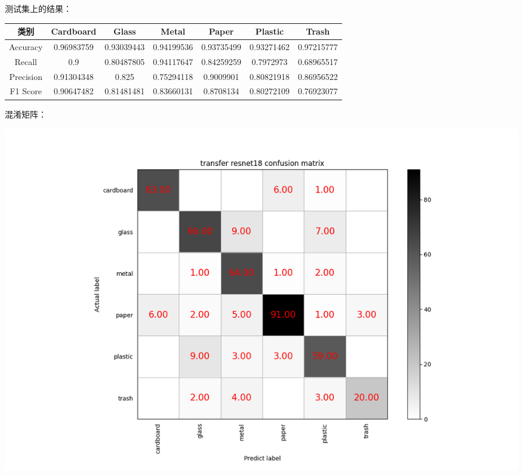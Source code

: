 \documentclass[UTF8]{ctexart}
\begin{document}
测试集上的结果：

\begin{tabular}{|c|c|c|c|c|c|c|}
\hline 
类别 & Cardboard & Glass & Metal & Paper & Plastic & Trash \\ 
\hline 
Accuracy &0.96983759& 0.93039443 &0.94199536& 0.93735499 &0.93271462& 0.97215777\\
 \hline 
Recall &0.9       & 0.80487805& 0.94117647& 0.84259259& 0.7972973 & 0.68965517\\ 
\hline 
Precision &0.91304348& 0.825  &    0.75294118& 0.9009901 & 0.80821918& 0.86956522   \\ 
\hline 
F1 Score &0.90647482& 0.81481481& 0.83660131& 0.8708134 & 0.80272109& 0.76923077\\ 
\hline 
\end{tabular}

混淆矩阵：

\includegraphics[scale=0.5]{cm/res18.png} 
\end{document}
